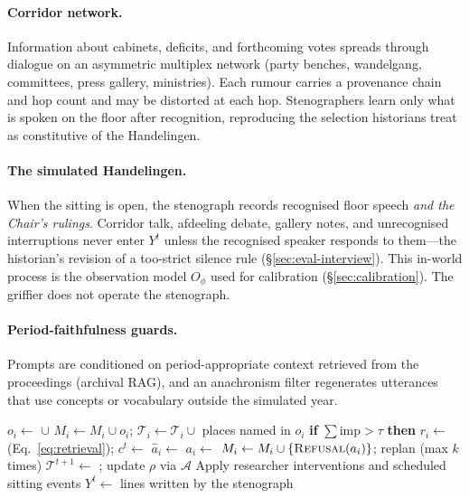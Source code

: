 \documentclass[sigconf,review,anonymous]{acmart}
\newcommand{\sys}{\textsc{Kamer}}
\begin{document}
\paragraph{Corridor network.} Information about cabinets, deficits, and
forthcoming votes spreads through dialogue on an asymmetric multiplex
network (party benches, wandelgang, committees, press gallery, ministries).
Each rumour carries a provenance chain and hop count and may be distorted
at each hop. Stenographers learn only what is spoken on the floor after
recognition, reproducing the selection historians treat as constitutive of
the Handelingen.

\paragraph{The simulated Handelingen.} When the sitting is open, the
stenograph records recognised floor speech \emph{and the Chair's rulings}.
Corridor talk, afdeeling debate, gallery notes, and unrecognised
interruptions never enter $Y^t$ unless the recognised speaker responds to
them---the historian's revision of a too-strict silence rule
(\S\ref{sec:eval-interview}). This in-world process is the observation
model $O_\phi$ used for calibration (\S\ref{sec:calibration}). The
griffier does not operate the stenograph.

\paragraph{Period-faithfulness guards.} Prompts are conditioned on
period-appropriate context retrieved from the proceedings (archival RAG),
and an anachronism filter regenerates utterances that use concepts or
vocabulary outside the simulated year.

\begin{algorithm}[t]
\caption{One sandbox step of \sys{}}
\label{alg:step}
\small
\begin{algorithmic}[1]
  \State $o_i \gets$  $\cup$ 
  \State $M_i \gets M_i \cup o_i$;\; $\mathcal{T}_i\gets\mathcal{T}_i\cup$ places named in $o_i$
  \State \textbf{if} $\sum\text{imp}>\tau$ \textbf{then} 
  \State $r_i \gets$  (Eq.~\ref{eq:retrieval});\; $c^t \gets$ 
  \State $\hat a_i \gets$ 
  \State $a_i \gets$  
     \State $M_i \gets M_i\cup\{\textsc{Refusal}(a_i)\}$;\; replan (max $k$ times)
  \EndIf
\EndFor
\State $\mathcal{T}^{t+1}\gets$ ; update $\rho$ via $\mathcal{A}$
\State Apply researcher interventions and scheduled sitting events
\State $Y^{t}\gets$ lines written by the stenograph 
\end{algorithmic}
\end{algorithm}
\end{document}
